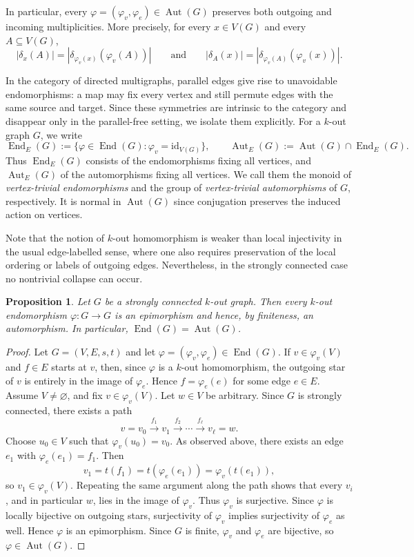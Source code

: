 \documentclass[a4paper,10pt]{amsart}
\theoremstyle{plain}
\newtheorem{proposition}[theorem]{Proposition}
\theoremstyle{definition}
\DeclareMathOperator{\Aut}{Aut}
\DeclareMathOperator{\End}{End}
\newcommand{\id}{\mathrm{id}}
\begin{document}
In particular, every $\varphi=(\varphi_v,\varphi_e)\in\Aut(G)$ preserves both outgoing and incoming multiplicities. More precisely, for every $x\in V(G)$ and every $A\subseteq V(G)$,
\[
|\delta_x(A)|=|\delta_{\varphi_v(x)}(\varphi_v(A))|
\qquad\text{and}\qquad
|\delta_A(x)|=|\delta_{\varphi_v(A)}(\varphi_v(x))|.
\]

In the category of directed multigraphs, parallel edges give rise to unavoidable endomorphisms: a map may fix every vertex and still permute edges with the same source and target. Since these symmetries are intrinsic to the category and disappear only in the parallel-free setting, we isolate them explicitly. For a $k$-out graph $G$, we write
\[
\End_E(G):=\{\varphi\in\End(G):\varphi_v=\id_{V(G)}\},
\qquad
\Aut_E(G):=\Aut(G)\cap \End_E(G).
\]
Thus $\End_E(G)$ consists of the endomorphisms fixing all vertices, and $\Aut_E(G)$ of the automorphisms fixing all vertices. We call them the monoid of \emph{vertex-trivial endomorphisms} and the group of \emph{vertex-trivial automorphisms} of $G$, respectively. It is normal in $\Aut(G)$ since conjugation preserves the induced action on vertices.

Note that the notion of $k$-out homomorphism is weaker than local injectivity in the usual edge-labelled sense, where one also requires preservation of the local ordering or labels of outgoing edges. Nevertheless, in the strongly connected case no nontrivial collapse can occur.

\begin{proposition}\label{prop:strongly-connected-endo-auto}
Let $G$ be a strongly connected $k$-out graph. Then every $k$-out endomorphism $\varphi:G\to G$ is an epimorphism and hence, by finiteness, an automorphism. In particular, $\End(G)=\Aut(G)$.
\end{proposition}

\begin{proof}
Let $G=(V,E,s,t)$ and let $\varphi=(\varphi_v,\varphi_e)\in\End(G)$. If $v\in \varphi_v(V)$ and $f\in E$ starts at $v$, then, since $\varphi$ is a $k$-out homomorphism, the outgoing star of $v$ is entirely in the image of $\varphi_e$. Hence $f=\varphi_e(e)$ for some edge $e\in E$. Assume $V\neq\varnothing$, and fix $v\in \varphi_v(V)$. Let $w\in V$ be arbitrary. Since $G$ is strongly connected, there exists a path
\[
v=v_0\xrightarrow{f_1}v_1\xrightarrow{f_2}\cdots\xrightarrow{f_\ell}v_\ell=w.
\]
Choose $u_0\in V$ such that $\varphi_v(u_0)=v_0$. As observed above, there exists an edge $e_1$ with $\varphi_e(e_1)=f_1$. Then
\[
v_1=t(f_1)=t(\varphi_e(e_1))=\varphi_v(t(e_1)),
\]
so $v_1\in \varphi_v(V)$. Repeating the same argument along the path shows that every $v_i$, and in particular $w$, lies in the image of $\varphi_v$. Thus $\varphi_v$ is surjective. Since $\varphi$ is locally bijective on outgoing stars, surjectivity of $\varphi_v$ implies surjectivity of $\varphi_e$ as well. Hence $\varphi$ is an epimorphism. Since $G$ is finite, $\varphi_v$ and $\varphi_e$ are bijective, so $\varphi\in\Aut(G)$.
\end{proof}
\end{document}
